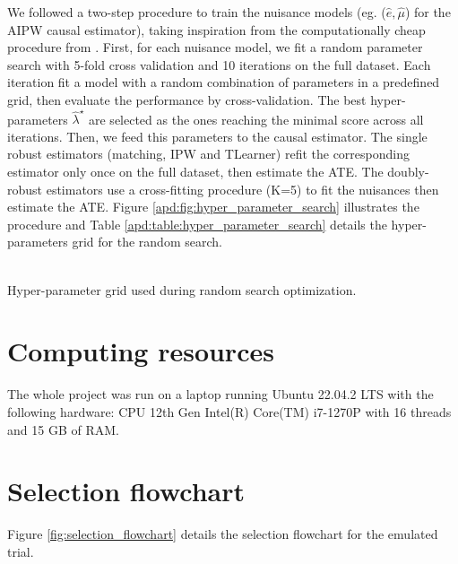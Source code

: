 \documentclass[french,12pt,twoside,a4paper]{book}
\begin{document}
\begin{appendices}
  We followed a two-step procedure to train the nuisance models (eg. ($\hat e,
    \hat \mu$) for the AIPW causal estimator), taking inspiration from the
  computationally cheap procedure from
  \cite[section~3.3]{bouthillier2021accounting}. First, for each nuisance
  model, we fit a random parameter search with 5-fold cross validation and 10
  iterations on the full dataset. Each iteration fit a model with a random
  combination of parameters in a predefined grid, then evaluate the
  performance by cross-validation. The best hyper-parameters $\hat
    \lambda^{\star}$ are selected as the ones reaching the minimal score across
  all iterations. Then, we feed this parameters to the causal estimator. The
  single robust estimators (matching, IPW and TLearner) refit the
  corresponding estimator only once on the full dataset, then estimate the
  ATE. The doubly-robust estimators use a cross-fitting procedure (K=5) to fit
  the nuisances then estimate the ATE. Figure
  \ref{apd:fig:hyper_parameter_search} illustrates the procedure and Table
  \ref{apd:table:hyper_parameter_search} details the hyper-parameters grid for
  the random search.


  \begin{table}[]
    \resizebox{\textwidth}{!}{%
      
    }\\
    \caption{Hyper-parameter grid used during random search
      optimization.}\label{apd:table:hyper_parameter_search}
  \end{table}


  \section{Computing resources}

  The whole project was run on a laptop running Ubuntu 22.04.2 LTS with the following hardware:
  CPU 12th Gen Intel(R) Core(TM) i7-1270P with 16 threads and 15 GB of RAM.

  \section{Selection flowchart}\label{apd:selection_flowchart}

  Figure \ref{fig:selection_flowchart} details the selection flowchart for the emulated trial.


\end{appendices}
\end{document}
